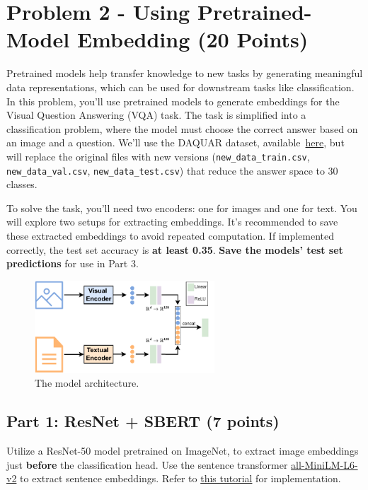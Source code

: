 \documentclass[11pt, oneside]{article}   	%
\begin{document}
\newpage

\section*{Problem 2 - Using Pretrained-Model Embedding (20 Points)}
Pretrained models help transfer knowledge to new tasks by generating meaningful data representations, which can be used for downstream tasks like classification.
In this problem, you'll use pretrained models to generate embeddings for the Visual Question Answering (VQA) task. The task is simplified into a classification problem, where the model must choose the correct answer based on an image and a question. We'll use the DAQUAR dataset, available~\href{https://www.kaggle.com/datasets/tezansahu/processed-daquar-dataset}{here}, but will replace the original files with new versions (\texttt{new\_data\_train.csv}, \texttt{new\_data\_val.csv}, \texttt{new\_data\_test.csv}) that reduce the answer space to 30 classes.

To solve the task, you’ll need two encoders: one for images and one for text. You will explore two setups for extracting embeddings. It's recommended to save these extracted embeddings to avoid repeated computation. If implemented correctly, the test set accuracy is \textbf{at least 0.35}. \textbf{Save the models' test set predictions} for use in Part 3.

\begin{figure}[h]
    \centering
  \includegraphics[width=0.6\textwidth]{images/model.pdf}
  \caption{The model architecture.}
  \label{fig:model}
\end{figure}

\subsection*{Part 1: ResNet + SBERT (7 points)}

Utilize a ResNet-50 model pretrained on ImageNet, to extract image embeddings just \textbf{before} the classification head. Use the sentence transformer \href{https://huggingface.co/sentence-transformers/all-MiniLM-L6-v2}{all-MiniLM-L6-v2} to extract sentence embeddings. Refer to \href{https://huggingface.co/sentence-transformers/all-MiniLM-L6-v2#usage-sentence-transformers}{this tutorial} for implementation.
\end{document}
